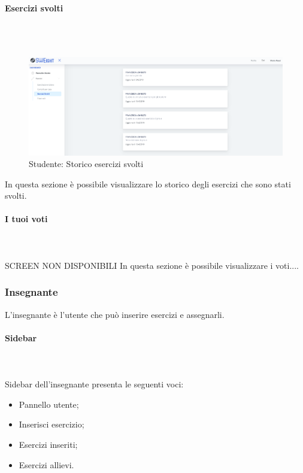         \paragraph{Esercizi svolti}\mbox{}\\ \\
        	\begin{figure}[H]
            	\centering
            	\includegraphics[width=17cm]{sez/img/studente/esercizisvolti.png} 
            	\caption{Studente: Storico esercizi svolti}\label{fig:1}
        	\end{figure}
          In questa sezione è possibile visualizzare  lo storico degli esercizi che sono stati svolti.
        
        
        
        
        \paragraph{I tuoi voti}\mbox{}\\ \\
          SCREEN NON DISPONIBILI
          In questa sezione è possibile visualizzare i voti....
        
        
        
        
        
\newpage
    \subsubsection{Insegnante}
      L'insegnante è l'utente che può inserire esercizi e assegnarli.
        \paragraph{Sidebar}\mbox{}\\ \\
          Sidebar dell'insegnante presenta le seguenti voci:
        	\begin{itemize}
            	\item Pannello utente;
            	\item Inserisci esercizio;
            	\item Esercizi inseriti;
            	\item Esercizi allievi.
        	\end{itemize}
        
